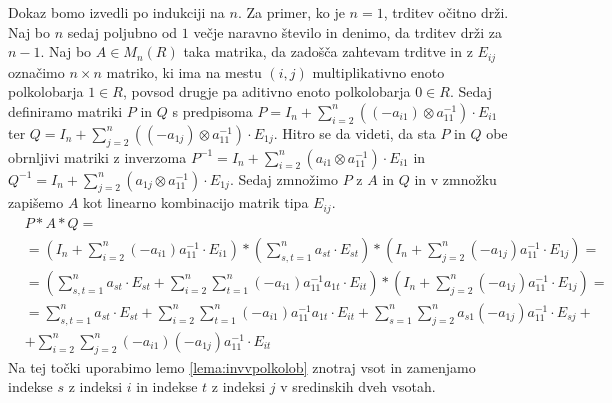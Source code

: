 \documentclass[mat1]{fmfdelo}
\begin{document}
\begin{dokaz}
	Dokaz bomo izvedli po indukciji na $n$. Za primer, ko je $n = 1$, trditev očitno drži. Naj bo $n$ sedaj poljubno od $1$ večje naravno število in denimo, da trditev drži za $n-1$. Naj bo $A\in M_n(R)$ taka matrika, da zadošča zahtevam trditve in z $E_{ij}$ označimo $n\times n$ matriko, ki ima na mestu $(i, j)$ multiplikativno enoto polkolobarja $1\in R$, povsod drugje pa aditivno enoto polkolobarja $0\in R$. Sedaj definiramo matriki $P$ in $Q$ s predpisoma $P = I_n + \sum_{i = 2}^{n}((-a_{i1})\otimes a_{11}^{-1})\cdot E_{i1}$ ter $Q = I_n + \sum_{j = 2}^{n}((-a_{1j})\otimes a_{11}^{-1})\cdot E_{1j}$. Hitro se da videti, da sta $P$ in $Q$ obe obrnljivi matriki z inverzoma $P^{-1} = I_n + \sum_{i = 2}^{n}(a_{i1}\otimes a_{11}^{-1})\cdot E_{i1}$ in $Q^{-1} =I_n + \sum_{j = 2}^{n}(a_{1j}\otimes a_{11}^{-1})\cdot E_{1j}$. Sedaj zmnožimo $P$ z $A$ in $Q$ in v zmnožku zapišemo $A$ kot linearno kombinacijo matrik tipa $E_{ij}$.
	\begin{align*}
		& P*A*Q = \\ 
		&= \left(I_n + \sum_{i = 2}^{n}(-a_{i1}) a_{11}^{-1}\cdot E_{i1}\right)*\left(\sum_{s, t = 1}^{n}a_{st}\cdot E_{st}\right)*\left(I_n + \sum_{j = 2}^{n}(-a_{1j})a_{11}^{-1}\cdot E_{1j}\right) = \\
		&=\left(\sum_{s, t = 1}^{n}a_{st}\cdot E_{st} + \sum_{i = 2}^{n}\sum_{t = 1}^{n} (-a_{i1})a_{11}^{-1}a_{1t}\cdot E_{it}\right)*\left(I_n + \sum_{j = 2}^{n}(-a_{1j})a_{11}^{-1}\cdot E_{1j}\right) = \\
		&= \sum_{s, t = 1}^{n}a_{st}\cdot E_{st} + \sum_{i = 2}^{n}\sum_{t = 1}^{n} (-a_{i1})a_{11}^{-1}a_{1t}\cdot E_{it} + \sum_{s = 1}^{n}\sum_{j = 2}^{n} a_{s1}(-a_{1j})a_{11}^{-1}\cdot E_{sj} + \\
		&+ \sum_{i = 2}^{n}\sum_{j=2}^{n} (-a_{i1})(-a_{1j})a_{11}^{-1}\cdot E_{it}
	\end{align*}
	Na tej točki uporabimo lemo \ref{lema:invvpolkolob} znotraj vsot in zamenjamo indekse $s$ z indeksi $i$ in indekse $t$ z indeksi $j$ v sredinskih dveh vsotah.
	

\end{dokaz}
\end{document}
